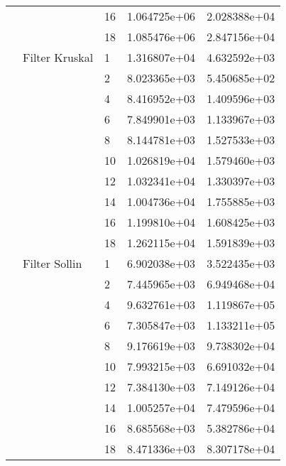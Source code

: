 \begin{tabular}{lllrr}
                      &                     & 16 &  1.064725e+06 &  2.028388e+04 \\
                      &                     & 18 &  1.085476e+06 &  2.847156e+04 \\
                      & Filter Kruskal & 1  &  1.316807e+04 &  4.632592e+03 \\
                      &                     & 2  &  8.023365e+03 &  5.450685e+02 \\
                      &                     & 4  &  8.416952e+03 &  1.409596e+03 \\
                      &                     & 6  &  7.849901e+03 &  1.133967e+03 \\
                      &                     & 8  &  8.144781e+03 &  1.527533e+03 \\
                      &                     & 10 &  1.026819e+04 &  1.579460e+03 \\
                      &                     & 12 &  1.032341e+04 &  1.330397e+03 \\
                      &                     & 14 &  1.004736e+04 &  1.755885e+03 \\
                      &                     & 16 &  1.199810e+04 &  1.608425e+03 \\
                      &                     & 18 &  1.262115e+04 &  1.591839e+03 \\
                      & Filter Sollin & 1  &  6.902038e+03 &  3.522435e+03 \\
                      &                     & 2  &  7.445965e+03 &  6.949468e+04 \\
                      &                     & 4  &  9.632761e+03 &  1.119867e+05 \\
                      &                     & 6  &  7.305847e+03 &  1.133211e+05 \\
                      &                     & 8  &  9.176619e+03 &  9.738302e+04 \\
                      &                     & 10 &  7.993215e+03 &  6.691032e+04 \\
                      &                     & 12 &  7.384130e+03 &  7.149126e+04 \\
                      &                     & 14 &  1.005257e+04 &  7.479596e+04 \\
                      &                     & 16 &  8.685568e+03 &  5.382786e+04 \\
                      &                     & 18 &  8.471336e+03 &  8.307178e+04 \\

\end{tabular}
